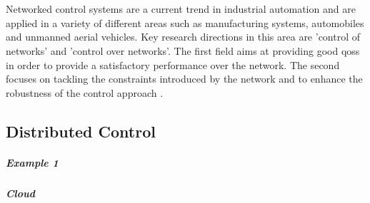 \chapter{}
\label{sec:state_of_the_art}

Networked control systems are a current trend in industrial automation and are applied in a variety of different areas such as manufacturing systems, automobiles and unmanned aerial vehicles. Key research directions in this area are 'control of networks' and 'control over networks'. The first field aims at providing good \glspl{qos} in order to provide a satisfactory performance over the network. The second focuses on tackling the constraints introduced by the network and to enhance the robustness of the control approach \cite{zhang_networked_2020}.

\section{Distributed Control}
\paragraph{Example 1}
\paragraph{Cloud}

